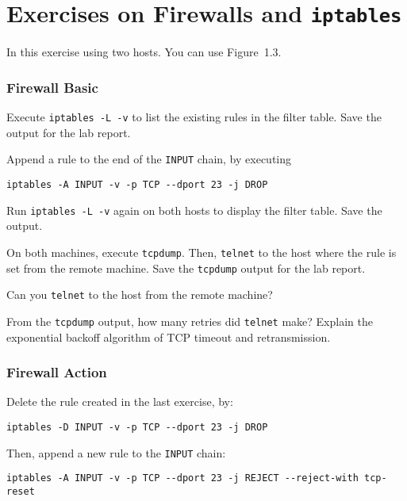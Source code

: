\documentclass{../UTNetLab}
\begin{document}
\part{Exercises on Firewalls and \texttt{iptables}}
    In this exercise using two hosts.
    You can use Figure~1.3.

\section{Firewall Basic}
    Execute \lstinline{iptables -L -v} to list the existing rules in the filter table.
    Save the output for the lab report.

    Append a rule to the end of the \texttt{INPUT} chain, by executing
    \begin{lstlisting}
iptables -A INPUT -v -p TCP --dport 23 -j DROP
    \end{lstlisting}
    
    Run \lstinline{iptables -L -v} again on both hosts to display the filter table.
    Save the output.

    On both machines, execute \lstinline{tcpdump}.
    Then, \lstinline{telnet} to the host where the rule is set from the remote machine.
    Save the \lstinline{tcpdump} output for the lab report.

    \begin{report}
    \item Can you \lstinline{telnet} to the host from the remote machine?
    
    \item From the \lstinline{tcpdump} output, how many retries did \lstinline{telnet} make? Explain the exponential backoff algorithm of TCP timeout and retransmission.
    \end{report}
    
\section{Firewall Action}
    Delete the rule created in the last exercise, by:    
    \begin{lstlisting}
iptables -D INPUT -v -p TCP --dport 23 -j DROP
    \end{lstlisting}
    
    Then, append a new rule to the \texttt{INPUT} chain:    
    \begin{lstlisting}
iptables -A INPUT -v -p TCP --dport 23 -j REJECT --reject-with tcp-reset
    \end{lstlisting}
    
\end{document}
